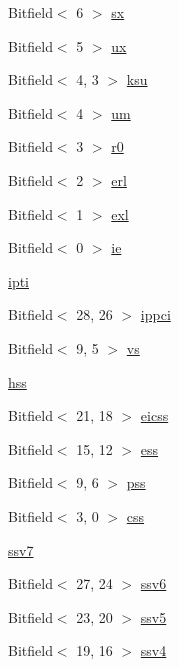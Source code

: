 \begin{DoxyCompactItemize}
\item 
Bitfield$<$ 6 $>$ \hyperlink{namespaceMipsISA_a1e52215e1dfd7606326c34c87a045e1b}{sx}
\item 
Bitfield$<$ 5 $>$ \hyperlink{namespaceMipsISA_afc2b03c55af2f2f9166326e6dc58da97}{ux}
\item 
Bitfield$<$ 4, 3 $>$ \hyperlink{namespaceMipsISA_aec77ac7da21a12c9ba945e3dc3f0e2e7}{ksu}
\item 
Bitfield$<$ 4 $>$ \hyperlink{namespaceMipsISA_abf0b3e2a829fb27d854c8201382792c5}{um}
\item 
Bitfield$<$ 3 $>$ \hyperlink{namespaceMipsISA_aade3332c7dc81974ea8123142c39d4e7}{r0}
\item 
Bitfield$<$ 2 $>$ \hyperlink{namespaceMipsISA_ac40fa2f88035ef3a169c28b1451444d7}{erl}
\item 
Bitfield$<$ 1 $>$ \hyperlink{namespaceMipsISA_a6e38f8e879fe70aca77ab90389d39e97}{exl}
\item 
Bitfield$<$ 0 $>$ \hyperlink{namespaceMipsISA_a9dddfa702a98a0bcbb1124a7b8d8829f}{ie}
\item 
\hyperlink{namespaceMipsISA_aea57d259bbcf928acce679375552af95}{ipti}
\item 
Bitfield$<$ 28, 26 $>$ \hyperlink{namespaceMipsISA_a7309c867975d199212ccce1ff17dae8f}{ippci}
\item 
Bitfield$<$ 9, 5 $>$ \hyperlink{namespaceMipsISA_a71505b3d754f8feffb75aa29ffce5018}{vs}
\item 
\hyperlink{namespaceMipsISA_aefc5b14dee9372c996ede673bbe6200b}{hss}
\item 
Bitfield$<$ 21, 18 $>$ \hyperlink{namespaceMipsISA_adf900946dd9057683c09e897d437fef1}{eicss}
\item 
Bitfield$<$ 15, 12 $>$ \hyperlink{namespaceMipsISA_a40ac34a9b1d1585cc8fa9c993f23f296}{ess}
\item 
Bitfield$<$ 9, 6 $>$ \hyperlink{namespaceMipsISA_a8ab8c6bb3bc0900da6558f860216c85e}{pss}
\item 
Bitfield$<$ 3, 0 $>$ \hyperlink{namespaceMipsISA_a4bbfd9582ec10449c4fb3e4da5252da7}{css}
\item 
\hyperlink{namespaceMipsISA_ab3583a029aa21c5b94ede4868cfe5f53}{ssv7}
\item 
Bitfield$<$ 27, 24 $>$ \hyperlink{namespaceMipsISA_a00b777531b697aba0ad1945ab317b903}{ssv6}
\item 
Bitfield$<$ 23, 20 $>$ \hyperlink{namespaceMipsISA_a8829b395acfc673faa6d285ff5436904}{ssv5}
\item 
Bitfield$<$ 19, 16 $>$ \hyperlink{namespaceMipsISA_a7706ed8beed02644f0d9535d70ec7ae3}{ssv4}

\end{DoxyCompactItemize}
